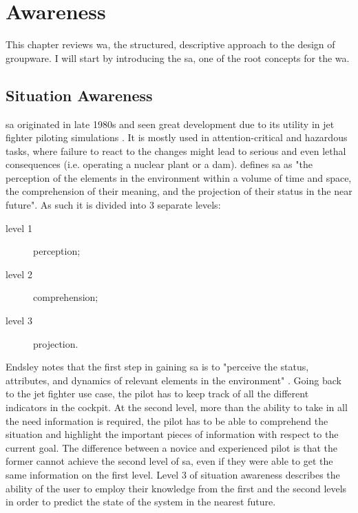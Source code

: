 
\chapter{Awareness}

This chapter reviews \gls{wa}, the structured, descriptive approach to the design of groupware. I will start by introducing the \gls{sa}, one of the root concepts for the \gls{wa}.

\section{Situation Awareness}


\gls{sa} originated in late 1980s and seen great development  due to its utility in jet fighter piloting simulations \cite{endsley_situation_1988}. It is mostly used in attention-critical and hazardous tasks, where failure to react to the changes might lead to serious and even lethal consequences (i.e. operating a nuclear plant or a dam).
\cite{endsley_design_1988} defines \gls{sa} as "the perception of the elements in the environment within a volume of time and space, the comprehension of their meaning, and the projection of their status in the near future". As such it is divided into 3 separate levels:

\begin{description}
	\item[level 1] perception;
	\item[level 2] comprehension;
	\item[level 3] projection.
\end{description}

Endsley notes that the first step in gaining \gls{sa} is to "perceive the status, attributes, and dynamics of relevant elements in the environment" \cite{salvendy_copyright_nodate}. Going back to the jet fighter use case, the pilot has to keep track of all the different indicators in the cockpit. At the second level, more than the ability to take in all the need information is required, the pilot has to be able to comprehend the situation and highlight the important pieces of information with respect to the current goal. The difference between a novice and experienced pilot is that the former cannot achieve the second level of \gls{sa}, even if they were able to get the same information on the first level. Level 3 of situation awareness describes the ability of the user to employ their knowledge from the first and the second levels in order to predict the state of the system in the nearest future.

